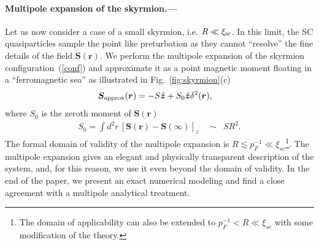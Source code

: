 \documentclass[twocolumn,showpacs,floatfix,longbibliography]{revtex4-1}
\begin{document}
\paragraph*{Multipole expansion of the skyrmion.---} \label{sec:analytics}
Let us now consider a case of a small skyrmion, i.e. $R\ll\xi_{\rm sc}$. In this limit, the SC quasiparticles sample the point like preturbation as they cannot ``resolve'' the fine details of the field $\bm S(\bm r)$. We perform the multipole expansion of the skyrmion configuration~(\ref{conf}) and approximate it as a point magnetic moment floating in a ``ferromagnetic sea'' as illustrated in Fig.~\ref{fig:skyrmion}(c)
\begin{align}
	\bm S_{\rm approx}(\bm r) & =  - S \hat{\bm z} + S_0 \hat{\bm z} \delta^2(\bm r),  \label{vr}
\end{align}
where $S_0$ is the zeroth moment of $\bm S(\bm r)$
\begin{align}
	S_0 = \int  d^2r \, \left[\bm S(\bm r)-\bm S(\infty)\right]_z  \quad \sim \,\,\,SR^2. \label{S0}
\end{align}
The formal domain of validity of the multipole expansion is $R \lesssim p_F^{-1} \ll \xi_{sc}$\footnote{The domain of applicability can also be extended to $p_F^{-1}<R\ll \xi_{sc}$ with some modification of the theory.}. The multipole expansion gives an elegant and physically transparent description of the system, and, for this reason, we use it even beyond the domain of validity. In the end of the paper, we present an exact numerical modeling and find a close agreement with a multipole analytical treatment.
\end{document}
